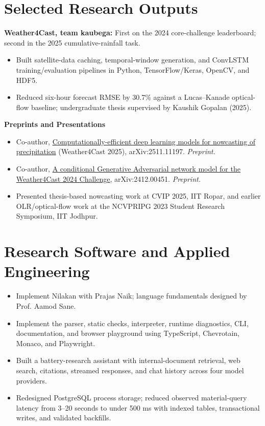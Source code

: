 \section{Selected Research Outputs}
\textbf{Weather4Cast, team kaubega:} First on the 2024 core-challenge leaderboard; second in the 2025 cumulative-rainfall task.\par
{}
\begin{itemize}
  \item Built satellite-data caching, temporal-window generation, and ConvLSTM training/evaluation pipelines in Python, TensorFlow/Keras, OpenCV, and HDF5.
  \item Reduced six-hour forecast RMSE by 30.7\% against a Lucas--Kanade optical-flow baseline; undergraduate thesis supervised by Kaushik Gopalan (2025).
\end{itemize}
\textbf{Preprints and Presentations}\par
\begin{itemize}
  \item Co-author, \href{https://arxiv.org/abs/2511.11197}{Computationally-efficient deep learning models for nowcasting of precipitation} (Weather4Cast 2025), arXiv:2511.11197. \textit{Preprint.}
  \item Co-author, \href{https://arxiv.org/abs/2412.00451}{A conditional Generative Adversarial network model for the Weather4Cast 2024 Challenge}, arXiv:2412.00451. \textit{Preprint.}
  \item Presented thesis-based nowcasting work at CVIP 2025, IIT Ropar, and earlier OLR/optical-flow work at the NCVPRIPG 2023 Student Research Symposium, IIT Jodhpur.
\end{itemize}
\section{Research Software and Applied Engineering}
\begin{itemize}
  \item Implement Nilakan with Prajas Naik; language fundamentals designed by Prof. Aamod Sane.
  \item Implement the parser, static checks, interpreter, runtime diagnostics, CLI, documentation, and browser playground using TypeScript, Chevrotain, Monaco, and Playwright.
\end{itemize}
\begin{itemize}
  \item Built a battery-research assistant with internal-document retrieval, web search, citations, streamed responses, and chat history across four model providers.
  \item Redesigned PostgreSQL process storage; reduced observed material-query latency from 3--20 seconds to under 500 ms with indexed tables, transactional writes, and validated backfills.
\end{itemize}
